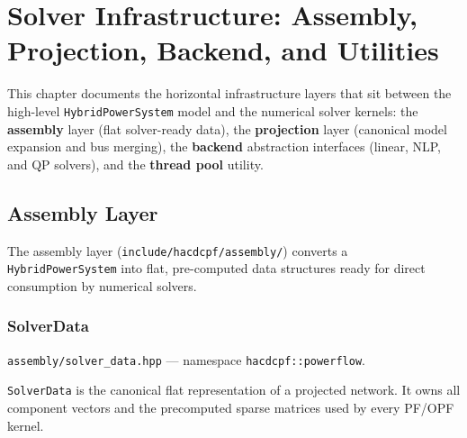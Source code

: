 \section{Solver Infrastructure: Assembly, Projection, Backend, and Utilities}
\label{sec:solver-infra}

This chapter documents the horizontal infrastructure layers that sit between
the high-level \texttt{HybridPowerSystem} model and the numerical solver
kernels: the \textbf{assembly} layer (flat solver-ready data), the
\textbf{projection} layer (canonical model expansion and bus merging), the
\textbf{backend} abstraction interfaces (linear, NLP, and QP solvers), and
the \textbf{thread pool} utility.

\subsection{Assembly Layer}
\label{sec:assembly}

The assembly layer (\texttt{include/hacdcpf/assembly/}) converts a
\texttt{HybridPowerSystem} into flat, pre-computed data structures ready for
direct consumption by numerical solvers.

\subsubsection{SolverData}
\label{sec:solver-data}

\texttt{assembly/solver\_data.hpp} --- namespace \texttt{hacdcpf::powerflow}.

\texttt{SolverData} is the canonical flat representation of a projected
network.  It owns all component vectors and the precomputed sparse matrices
used by every PF/OPF kernel.

